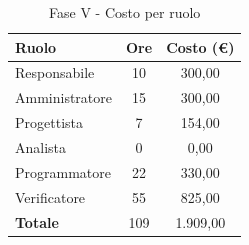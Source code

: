 \documentclass[../PianoProgetto.tex]{subfiles}
\begin{document}
	\begin{table}[H]
		\centering
	
		\begin{tabular}{l * {2}{c}}
			\toprule
			\textbf{Ruolo} & \textbf{Ore} & \textbf{Costo (\euro{})} \\
			\midrule
			Responsabile & 10 & 300,00 \\
			Amministratore  & 15 & 300,00 \\
			Progettista  & 7 & 154,00 \\
			Analista & 0 & 0,00 \\
			Programmatore  & 22 &  330,00 \\
			Verificatore  & 55 &  825,00 \\
			\midrule
			\textbf{Totale}  & 109   &  1.909,00 \\
			\bottomrule	
		\end{tabular}
		\caption{Fase V - Costo per ruolo}
		\label{tab:faseV_costo}
	\end{table}
\vfill	
	
\end{document}
